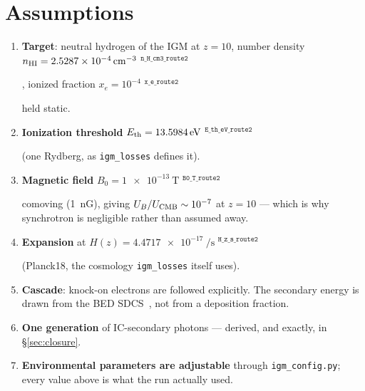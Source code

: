 \documentclass[11pt,a4paper]{article}
\newif\ifprovdraft
\newcommand{\src}[1]{%
  \ifprovdraft
    \ifmmode{}^{\text{\color{gray}\scriptsize\texttt{#1}}}%
    \else{\color{gray}\scriptsize$^{\texttt{#1}}$}%
    \fi
  \fi}
\begin{document}
\section{Assumptions}
\begin{enumerate}\itemsep2pt
\item \textbf{Target}: neutral hydrogen of the IGM at $z=10$, number density
      $n_{\rm HI} = \SI{2.5287e-4}{\per\cubic\centi\metre}$\src{n\_H\_cm3\_route2},
      ionized fraction $x_e = 10^{-4}$\src{x\_e\_route2} held static.
\item \textbf{Ionization threshold} $E_{\rm th} = \SI{13.5984}{\electronvolt}$\src{E\_th\_eV\_route2}
      (one Rydberg, as \texttt{igm\_losses} defines it).
\item \textbf{Magnetic field} $B_0 = \SI{1e-13}{\tesla}$\src{B0\_T\_route2}
      comoving (1~nG), giving $U_B/U_{\rm CMB}\sim10^{-7}$ at $z=10$ --- which
      is why synchrotron is negligible rather than assumed away.
\item \textbf{Expansion} at $H(z) = \SI{4.4717e-17}{\per\second}$\src{H\_z\_s\_route2}
      (Planck18, the cosmology \texttt{igm\_losses} itself uses).
\item \textbf{Cascade}: knock-on electrons are followed explicitly. The
      secondary energy is drawn from the BED SDCS~\cite{kimrudd94}, not from a
      deposition fraction.
\item \textbf{One generation} of IC-secondary photons --- derived, and exactly,
      in \S\ref{sec:closure}.
\item \textbf{Environmental parameters are adjustable} through
      \texttt{igm\_config.py}; every value above is what the run actually used.
\end{enumerate}
\end{document}
